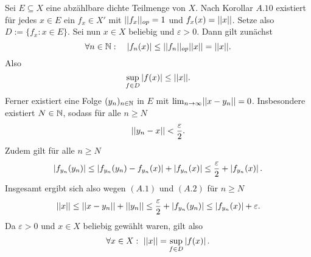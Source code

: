 \begin{proof*}
    Sei $E \subseteq X$ eine abzählbare dichte Teilmenge von $X$. Nach Korollar $A.10$ existiert für jedes $x \in E$ ein $f_x \in X'$ mit 
    $\lvert\lvert f_x \rvert\rvert_{op} = 1$ und $f_x(x) = \lvert\lvert x \rvert\rvert$. Setze also $D:=\{f_x : x \in E\}$. Sei nun $x \in X$ beliebig und $\varepsilon > 0$. Dann gilt zunächst 
    $$
        \forall n \in \mathbb{N}: \quad \left| f_n(x) \right| \leq \lvert\lvert f_n \rvert\rvert_{op} \lvert\lvert x \rvert\rvert = \lvert\lvert x \rvert\rvert. 
    $$
    Also
    $$
        \sup_{f \in D}\left| f(x) \right| \leq \lvert\lvert x \rvert\rvert. 
    $$
    Ferner existiert eine Folge $(y_n)_{n \in \mathbb{N}}$ in $E$ mit $\lim_{n \to \infty}\lvert\lvert x-y_n \rvert\rvert = 0$. Insbesondere existiert $N \in \mathbb{N}$, sodass für alle $n \geq N$ 
    \begin{align}
        \lvert\lvert y_n - x \rvert\rvert < \frac{\varepsilon}{2}.
    \end{align}
    Zudem gilt für alle $n \geq N$
    \begin{align}
        \left| f_{y_n}(y_n) \right| \leq \left| f_{y_n}(y_n)-f_{y_n}(x) \right| + \left| f_{y_n}(x) \right| \leq \frac{\varepsilon}{2} + \left| f_{y_n}(x) \right|.
    \end{align}
    Insgesamt ergibt sich also wegen $(A.1)$ und $(A.2)$ für $n \geq N$
    $$
        \lvert\lvert x \rvert\rvert \leq \lvert\lvert x - y_n \rvert\rvert + \lvert\lvert y_n \rvert\rvert \leq \frac{\varepsilon}{2} + \left| f_{y_n}(y_n) \right| \leq \left| f_{y_n}(x) \right| + \varepsilon. 
    $$
    Da $\varepsilon > 0$ und $x \in X$ beliebig gewählt waren, gilt also 
    $$
        \forall x \in X: \ \lvert\lvert x \rvert\rvert = \sup_{f \in D}\left| f(x) \right|.  
    $$
\end{proof*}

